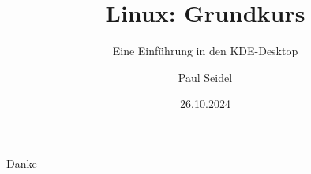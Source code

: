 \documentclass{beamer}
\title{Linux: Grundkurs}
\subtitle{Eine Einführung in den KDE-Desktop}
\author{Paul Seidel}
\date{26.10.2024} %
\institute{ZKK - Universität Passau}
\begin{document}
    \maketitle

    
    
    
    
    
    
    
    
    

    \begin{frame}[standout]
        Danke
    \end{frame}
\end{document}
